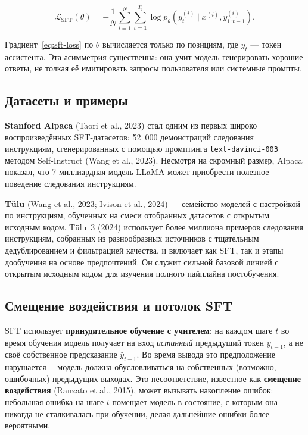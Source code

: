 \begin{equation}
\label{eq:sft-loss}
\mathcal{L}_{\mathrm{SFT}}(\theta) = -\frac{1}{N}\sum_{i=1}^{N}\sum_{t=1}^{T_i} \log p_\theta\!\left(y_t^{(i)} \mid x^{(i)}, y_{1:t-1}^{(i)}\right).
\end{equation}

Градиент~\eqref{eq:sft-loss} по $\theta$ вычисляется только по позициям, где $y_t$ --- токен ассистента. Эта асимметрия существенна: она учит модель генерировать хорошие ответы, не толкая её имитировать запросы пользователя или системные промпты.

\subsection{Датасеты и примеры}

\textbf{Stanford Alpaca} (Taori et al., 2023) стал одним из первых широко воспроизведённых SFT-датасетов: 52~000 демонстраций следования инструкциям, сгенерированных с помощью промптинга \texttt{text-davinci-003} методом Self-Instruct (Wang et al., 2023). Несмотря на скромный размер, Alpaca показал, что 7-миллиардная модель LLaMA может приобрести полезное поведение следования инструкциям.

\textbf{T\"{u}lu} (Wang et al., 2023; Ivison et al., 2024) --- семейство моделей с настройкой по инструкциям, обученных на смеси отобранных датасетов с открытым исходным кодом. T\"{u}lu~3 (2024) использует более миллиона примеров следования инструкциям, собранных из разнообразных источников с тщательным дедублированием и фильтрацией качества, и включает как SFT, так и этапы дообучения на основе предпочтений. Он служит сильной базовой линией с открытым исходным кодом для изучения полного пайплайна постобучения.

\subsection{Смещение воздействия и потолок SFT}

SFT использует \textbf{принудительное обучение с учителем}: на каждом шаге $t$ во время обучения модель получает на вход \emph{истинный} предыдущий токен $y_{t-1}$, а не своё собственное предсказание $\hat{y}_{t-1}$. Во время вывода это предположение нарушается\,---\,модель должна обусловливаться на собственных (возможно, ошибочных) предыдущих выходах. Это несоответствие, известное как \textbf{смещение воздействия} (Ranzato et al., 2015), может вызывать накопление ошибок: небольшая ошибка на шаге $t$ помещает модель в состояние, с которым она никогда не сталкивалась при обучении, делая дальнейшие ошибки более вероятными.

